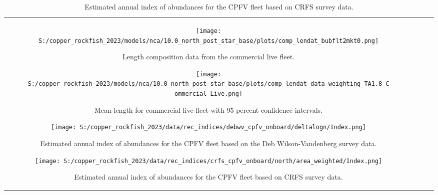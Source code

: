 \documentclass[11pt,
  letterpaper,
]{article}
\begin{document}
\begin{longtable}[t]{c>{\centering\arraybackslash}p{2cm}>{\centering\arraybackslash}p{2cm}>{\centering\arraybackslash}p{2cm}}
\begin{figure}
{\centering
\texttt{[image: S:/copper\_rockfish\_2023/models/nca/10.0\_north\_post\_star\_base/plots/comp\_lendat\_bubflt2mkt0.png]}
}
\caption{Length composition data from the commercial live fleet.\label{fig:com-live-len-data}}
\end{figure}

\begin{figure}
{\centering
\texttt{[image: S:/copper\_rockfish\_2023/models/nca/10.0\_north\_post\_star\_base/plots/comp\_lendat\_data\_weighting\_TA1.8\_Commercial\_Live.png]}
}
\caption{Mean length for commercial live fleet with 95 percent confidence intervals.\label{fig:mean-com-live-len-data}}
\end{figure}

\pagebreak

\begin{figure}
{\centering
\texttt{[image: S:/copper\_rockfish\_2023/data/rec\_indices/debwv\_cpfv\_onboard/deltalogn/Index.png]}
}
\caption{Estimated annual index of abundances for the CPFV fleet based on the Deb Wilson-Vandenberg survey data.\label{fig:dwv-index-main}}
\end{figure}

\pagebreak

\begin{figure}
{\centering
\texttt{[image: S:/copper\_rockfish\_2023/data/rec\_indices/crfs\_cpfv\_onboard/north/area\_weighted/Index.png]}
}
\caption{Estimated annual index of abundances for the CPFV fleet based on CRFS survey data.\label{fig:crfs-index-main}}
\end{figure}

\pagebreak


\end{longtable}
\end{document}
